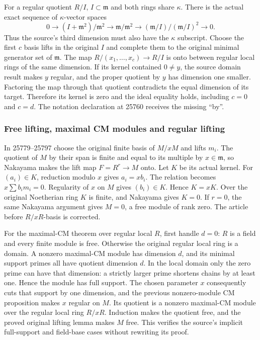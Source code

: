 For a regular quotient \(R/I\), \(I\subset\mathfrak m\) and both rings share \(\kappa\). There is the actual exact sequence of \(\kappa\)-vector spaces \[
 0\longrightarrow (I+\mathfrak m^2)/\mathfrak m^2
 \longrightarrow \mathfrak m/\mathfrak m^2
 \longrightarrow (\mathfrak m/I)/(\mathfrak m/I)^2\longrightarrow0 .
\] Thus the source's third dimension must also have the \(\kappa\) subscript. Choose the first \(c\) basis lifts in the original \(I\) and complete them to the original minimal generator set of \(\mathfrak m\). The map \(R/(x_1,\ldots,x_c)\to R/I\) is onto between regular local rings of the same dimension. If its kernel contained \(0\ne y\), the source domain result makes \(y\) regular, and the proper quotient by \(y\) has dimension one smaller. Factoring the map through that quotient contradicts the equal dimension of its target. Therefore its kernel is zero and the ideal equality holds, including \(c=0\) and \(c=d\). The notation declaration at 25760 receives the missing ``by''.

\subsubsection{Free lifting, maximal CM modules and regular lifting}\label{algebra-proof-020-free-lifting-maximal-cm-modules-and-regular-lifting}

In 25779--25797 choose the original finite basis of \(M/xM\) and lifts \(m_i\). The quotient of \(M\) by their span is finite and equal to its multiple by \(x\in\mathfrak m\), so Nakayama makes the lift map \(F=R^r\to M\) onto. Let \(K\) be its actual kernel. For \((a_i)\in K\), reduction modulo \(x\) gives \(a_i=xb_i\). The relation becomes \(x\sum b_im_i=0\). Regularity of \(x\) on \(M\) gives \((b_i)\in K\). Hence \(K=xK\). Over the original Noetherian ring \(K\) is finite, and Nakayama gives \(K=0\). If \(r=0\), the same Nakayama argument gives \(M=0\), a free module of rank zero. The article before \(R/xR\)-basis is corrected.

For the maximal-CM theorem over regular local \(R\), first handle \(d=0\): \(R\) is a field and every finite module is free. Otherwise the original regular local ring is a domain. A nonzero maximal-CM module has dimension \(d\), and its minimal support primes all have quotient dimension \(d\). In the local domain only the zero prime can have that dimension: a strictly larger prime shortens chains by at least one. Hence the module has full support. The chosen parameter \(x\) consequently cuts that support by one dimension, and the previous nonzero-module CM proposition makes \(x\) regular on \(M\). Its quotient is a nonzero maximal-CM module over the regular local ring \(R/xR\). Induction makes the quotient free, and the proved original lifting lemma makes \(M\) free. This verifies the source's implicit full-support and field-base cases without rewriting its proof.

